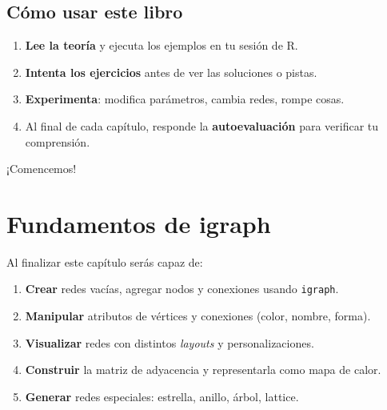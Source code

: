 \documentclass[
  letterpaper,
  DIV=11,
  numbers=noendperiod]{scrreprt}
\providecommand{\tightlist}{%
  \setlength{\itemsep}{0pt}\setlength{\parskip}{0pt}}
\begin{document}
\section*{Cómo usar este libro}\label{cuxf3mo-usar-este-libro}


\begin{enumerate}
\def\labelenumi{\arabic{enumi}.}
\tightlist
\item
  \textbf{Lee la teoría} y ejecuta los ejemplos en tu sesión de R.
\item
  \textbf{Intenta los ejercicios} antes de ver las soluciones o pistas.
\item
  \textbf{Experimenta}: modifica parámetros, cambia redes, rompe cosas.
\item
  Al final de cada capítulo, responde la \textbf{autoevaluación} para
  verificar tu comprensión.
\end{enumerate}

¡Comencemos!


\chapter{Fundamentos de igraph}\label{sec-fundamentos}

\begin{tcolorbox}[enhanced jigsaw, toprule=.15mm, colframe=quarto-callout-note-color-frame, coltitle=black, titlerule=0mm, colback=white, breakable, leftrule=.75mm, arc=.35mm, bottomtitle=1mm, toptitle=1mm, rightrule=.15mm, bottomrule=.15mm, left=2mm, title=\textcolor{quarto-callout-note-color}{\faInfo}\hspace{0.5em}{🎯 Objetivos de aprendizaje}, colbacktitle=quarto-callout-note-color!10!white, opacityback=0, opacitybacktitle=0.6]

Al finalizar este capítulo serás capaz de:

\begin{enumerate}
\def\labelenumi{\arabic{enumi}.}
\tightlist
\item
  \textbf{Crear} redes vacías, agregar nodos y conexiones usando
  \texttt{igraph}.
\item
  \textbf{Manipular} atributos de vértices y conexiones (color, nombre,
  forma).
\item
  \textbf{Visualizar} redes con distintos \emph{layouts} y
  personalizaciones.
\item
  \textbf{Construir} la matriz de adyacencia y representarla como mapa
  de calor.
\item
  \textbf{Generar} redes especiales: estrella, anillo, árbol, lattice.
\end{enumerate}

\end{tcolorbox}
\end{document}
